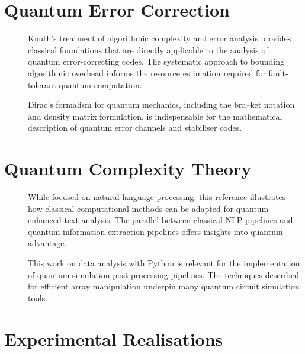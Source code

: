 \documentclass[
    language=english,
    doctype=article,
    institution=none,
    titlestyle=book,
]{../../omnilatex}
\begin{document}
\section{Quantum Error Correction}

\begin{description}
    \item[\cite{knuthFundamentalAlgorithms1973}] Knuth's treatment of
    algorithmic complexity and error analysis provides classical foundations
    that are directly applicable to the analysis of quantum error-correcting
    codes.  The systematic approach to bounding algorithmic overhead informs
    the resource estimation required for fault-tolerant quantum computation.

    \item[\cite{diracPrinciplesQuantumMechanics1981}] Dirac's formalism for
    quantum mechanics, including the bra--ket notation and density matrix
    formulation, is indispensable for the mathematical description of quantum
    error channels and stabiliser codes.
\end{description}

\section{Quantum Complexity Theory}

\begin{description}
    \item[\cite{birdNaturalLanguageProcessing2009}] While focused on natural
    language processing, this reference illustrates how classical computational
    methods can be adapted for quantum-enhanced text analysis.  The parallel
    between classical NLP pipelines and quantum information extraction
    pipelines offers insights into quantum advantage.

    \item[\cite{mckinneyPythonDataAnalysis2018}] This work on data analysis
    with Python is relevant for the implementation of quantum simulation
    post-processing pipelines.  The techniques described for efficient array
    manipulation underpin many quantum circuit simulation tools.
\end{description}

\section{Experimental Realisations}
\end{document}
